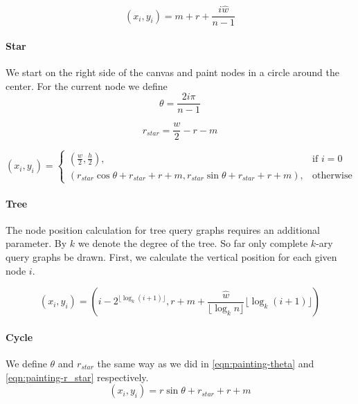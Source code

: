 \begin{equation}
    (x_i, y_i) = m + r + \frac{i\hat{w}}{n - 1}
\end{equation}

\paragraph{Star} 
We start on the right side of the canvas and paint nodes in a circle around the center.
For the current node we define
\begin{equation}\label{eqn:painting-theta}
    \theta = \frac{2i\pi}{n - 1}
\end{equation}

\begin{equation}\label{eqn:painting-r_star}
    r_{star} = \frac{w}{2} - r - m
\end{equation}

\begin{equation}
    (x_i, y_i) = 
    \begin{cases}
        (\frac{w}{2}, \frac{h}{2}),& \text{if } i = 0\\
        (r_{star}\cos{\theta} + r_{star} + r + m, r_{star}\sin{\theta} + r_{star} + r + m), & \text{otherwise}
    \end{cases}
\end{equation}

\paragraph{Tree}

The node position calculation for tree query graphs requires an additional parameter. 
By $k$ we denote the degree of the tree. So far only complete $k$-ary query graphs be drawn.
First, we calculate the vertical position for each given node $i$.

\begin{equation}
    (x_i, y_i) = (i - 2^{\lfloor \log_k(i+1) \rfloor}, r + m + \frac{\hat{w}}{\lfloor \log_kn \rfloor} \lfloor \log_k(i + 1) \rfloor)
\end{equation}

\paragraph{Cycle} 

We define $\theta$ and $r_{star}$ the same way as we did in \eqref{eqn:painting-theta} and \eqref{eqn:painting-r_star} respectively.
\begin{equation}
    (x_i, y_i) = r\sin{\theta} + r_{star} + r + m
\end{equation}
